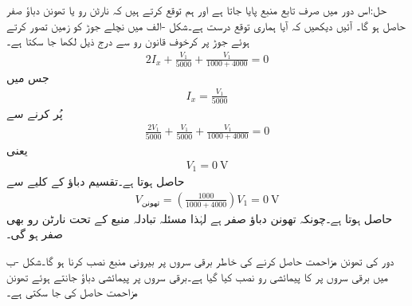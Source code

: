حل:اس دور میں صرف تابع منبع پایا جاتا ہے اور ہم توقع کرتے ہیں کہ نارٹن رو یا تھونن دباؤ صفر حاصل ہو گا۔ آئیں دیکھیں کہ آیا ہماری توقع درست ہے۔شکل -الف میں نچلے جوڑ کو زمین تصور کرتے  ہوئے جوڑ  پر کرخوف قانون رو سے درج ذیل لکھا جا سکتا ہے۔
\begin{align*}
2I_x+\frac{V_1}{5000}+\frac{V_1}{1000+4000}=0
\end{align*}
جس میں
\begin{align*}
I_x=\frac{V_1}{5000}
\end{align*}
پُر کرنے سے 
\begin{align*}
\frac{2 V_1}{5000}+\frac{V_1}{5000}+\frac{V_1}{1000+4000}=0
\end{align*}
یعنی
\begin{align*}
V_1=\SI{0}{\volt}
\end{align*}
حاصل ہوتا ہے۔تقسیم دباؤ کے کلیے سے 
\begin{align*}
V_{\text{تھونن}}=\left(\frac{1000}{1000+4000}\right) V_1=\SI{0}{\volt}
\end{align*}
حاصل ہوتا ہے۔چونکہ تھونن دباؤ صفر ہے لہٰذا مسئلہ تبادلہ منبع کے تحت نارٹن رو بھی صفر ہو گی۔


دور کی تھونن مزاحمت حاصل کرنے کی خاطر برقی سروں پر بیرونی منبع نصب کرنا ہو گا۔شکل -ب میں برقی سروں پر
  کا پیمائشی رو نصب کیا گیا ہے۔برقی سروں پر پیمائشی دباؤ  جانتے ہوئے  تھونن مزاحمت حاصل کی جا سکتی ہے۔

